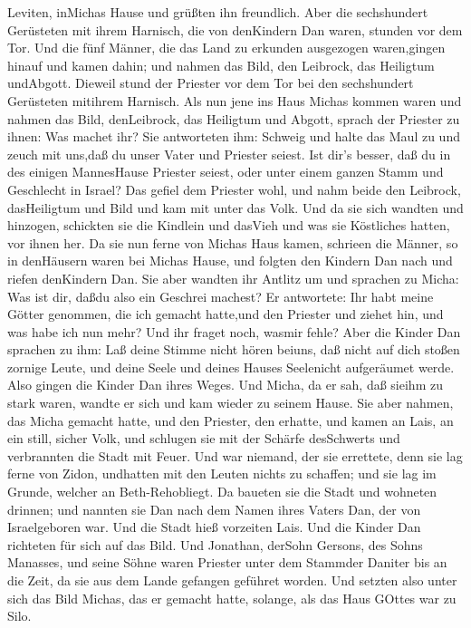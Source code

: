 Leviten, inMichas Hause und grüßten ihn freundlich.  Aber
die sechshundert Gerüsteten mit ihrem Harnisch, die von denKindern Dan
waren, stunden vor dem Tor.  Und die fünf Männer, die das
Land zu erkunden ausgezogen waren,gingen hinauf und kamen dahin; und
nahmen das Bild, den Leibrock, das Heiligtum undAbgott. Dieweil stund
der Priester vor dem Tor bei den sechshundert Gerüsteten mitihrem
Harnisch.  Als nun jene ins Haus Michas kommen waren und
nahmen das Bild, denLeibrock, das Heiligtum und Abgott, sprach der
Priester zu ihnen: Was machet ihr?  Sie antworteten ihm:
Schweig und halte das Maul zu und zeuch mit uns,daß du unser Vater und
Priester seiest. Ist dir's besser, daß du in des einigen MannesHause
Priester seiest, oder unter einem ganzen Stamm und Geschlecht in Israel?
 Das gefiel dem Priester wohl, und nahm beide den Leibrock,
dasHeiligtum und Bild und kam mit unter das Volk.  Und da
sie sich wandten und hinzogen, schickten sie die Kindlein und dasVieh
und was sie Köstliches hatten, vor ihnen her.  Da sie nun
ferne von Michas Haus kamen, schrieen die Männer, so in denHäusern waren
bei Michas Hause, und folgten den Kindern Dan nach und riefen denKindern
Dan.  Sie aber wandten ihr Antlitz um und sprachen zu
Micha: Was ist dir, daßdu also ein Geschrei machest?  Er
antwortete: Ihr habt meine Götter genommen, die ich gemacht hatte,und
den Priester und ziehet hin, und was habe ich nun mehr? Und ihr fraget
noch, wasmir fehle?  Aber die Kinder Dan sprachen zu ihm:
Laß deine Stimme nicht hören beiuns, daß nicht auf dich stoßen zornige
Leute, und deine Seele und deines Hauses Seelenicht aufgeräumet werde.
 Also gingen die Kinder Dan ihres Weges. Und Micha, da er
sah, daß sieihm zu stark waren, wandte er sich und kam wieder zu seinem
Hause.  Sie aber nahmen, das Micha gemacht hatte, und den
Priester, den erhatte, und kamen an Lais, an ein still, sicher Volk, und
schlugen sie mit der Schärfe desSchwerts und verbrannten die Stadt mit
Feuer.  Und war niemand, der sie errettete, denn sie lag
ferne von Zidon, undhatten mit den Leuten nichts zu schaffen; und sie
lag im Grunde, welcher an Beth-Rehobliegt. Da baueten sie die Stadt und
wohneten drinnen;  und nannten sie Dan nach dem Namen ihres
Vaters Dan, der von Israelgeboren war. Und die Stadt hieß vorzeiten
Lais.  Und die Kinder Dan richteten für sich auf das Bild.
Und Jonathan, derSohn Gersons, des Sohns Manasses, und seine Söhne waren
Priester unter dem Stammder Daniter bis an die Zeit, da sie aus dem
Lande gefangen geführet worden.  Und setzten also unter
sich das Bild Michas, das er gemacht hatte, solange, als das Haus GOttes
war zu Silo.

